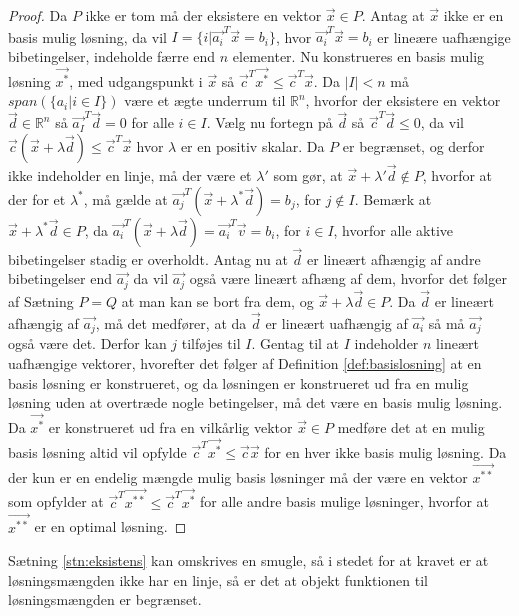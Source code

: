 \begin{proof}
Da $P$ ikke er tom må der eksistere en vektor $\vec{x} \in P$.
Antag at $\vec{x}$ ikke er en basis mulig løsning, da vil $I = \{i | \vec{a_i}^T\vec{x} = b_i\}$, hvor $\vec{a_i}^T\vec{x}=b_i$ er lineære uafhængige bibetingelser, indeholde færre end $n$ elementer. 
Nu konstrueres en basis mulig løsning $\vec{x^*}$, med udgangspunkt i $\vec{x}$ så $\vec{c}^T\vec{x^*}\leq \vec{c}^T\vec{x}$.
Da $|I|<n $ må $span(\{a_i | i \in I\})$ være et ægte underrum til $\mathds{R}^n$, hvorfor der eksistere en vektor $\vec{d} \in \mathds{R}^n$ så $\vec{a_I}^T\vec{d}=0$ for alle $i \in I$. 
Vælg nu fortegn på $\vec{d}$ så $\vec{c}^T\vec{d} \leq 0$, da vil $\vec{c}(\vec{x}+\lambda\vec{d}) \leq \vec{c}^T\vec{x}$ hvor $\lambda$ er en positiv skalar.
Da $P$ er begrænset, og derfor ikke indeholder en linje, må der være et $\lambda'$ som gør, at $\vec{x}+\lambda'\vec{d} \notin P$, hvorfor at der for et $\lambda^*$, må gælde at $\vec{a_j}^T(\vec{x}+\lambda^* \vec{d}) = b_j$, for $j \notin I$.
Bemærk at $\vec{x}+\lambda^*\vec{d} \in P$, da $\vec{a_i}^T(\vec{x}+\lambda\vec{d})= \vec{a_i}^T\vec{v} = b_i$, for $i \in I$, hvorfor alle aktive bibetingelser stadig er overholdt.
Antag nu at $\vec{d}$ er lineært afhængig af andre bibetingelser end $\vec{a_j}$ da vil $\vec{a_j}$ også være lineært afhæng af dem, hvorfor det følger af Sætning $P=Q$ at man kan se bort fra dem, og $\vec{x}+\lambda \vec{d} \in P$. 
Da $\vec{d}$ er lineært afhængig af $\vec{a_j}$, må det medfører, at da $\vec{d}$ er lineært uafhængig af $\vec{a_i}$ så må $\vec{a_j}$ også være det. 
Derfor kan $j$ tilføjes til $I$. 
Gentag til at $I$ indeholder $n$ lineært uafhængige vektorer, hvorefter det følger af Definition \ref{def:basislosning} at en basis løsning er konstrueret, og da løsningen er konstrueret ud fra en mulig løsning uden at overtræde nogle betingelser, må det være en basis mulig løsning.\\
Da $\vec{x^*}$ er konstrueret ud fra en vilkårlig vektor $\vec{x}\in P$ medføre det at en mulig basis løsning altid vil opfylde $\vec{c}^T\vec{x^*} \leq \vec{c}\vec{x}$ for en hver ikke basis mulig løsning. 
Da der kun er en endelig mængde mulig basis løsninger må der være en vektor $\vec{x^{**}}$ som opfylder at $\vec{c}^T\vec{x^{**}}\leq \vec{c}^T\vec{x^*}$ for alle andre basis mulige løsninger, hvorfor at $\vec{x^{**}}$ er en optimal løsning.
\end{proof}
Sætning \ref{stn:eksistens} kan omskrives en smugle, så i stedet for at kravet er at løsningsmængden ikke har en linje, så er det at objekt funktionen til løsningsmængden er begrænset.
